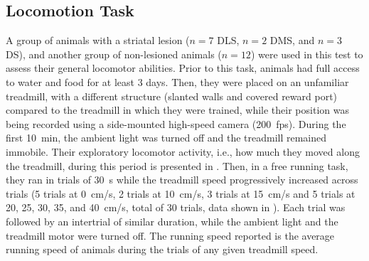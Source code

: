 \subsection{Locomotion Task} \label{ch:methods:loco}
A group of animals with a striatal lesion ($n=7$ DLS, $n=2$ DMS, and $n=3$ DS), and another group of non-lesioned animals ($n=12$) were used in this test to assess their general locomotor abilities.
Prior to this task, animals had full access to water and food for at least 3 days.
Then, they were placed on an unfamiliar treadmill, with a different structure (slanted walls and covered reward port) compared to the treadmill in which they were trained, while their position was being recorded using a side-mounted high-speed camera (200~fps).
During the first 10~min, the ambient light was turned off and the treadmill remained immobile.
Their exploratory locomotor activity, i.e., how much they moved along the treadmill, during this period is presented in .
Then, in a free running task, they ran in trials of 30~s while the treadmill speed progressively increased across trials (5 trials at 0~cm/s, 2 trials at 10~cm/s, 3 trials at 15~cm/s and 5 trials at 20, 25, 30, 35, and 40~cm/s, total of 30 trials, data shown in ).
Each trial was followed by an intertrial of similar duration, while the ambient light and the treadmill motor were turned off.
The running speed reported is the average running speed of animals during the trials of any given treadmill speed.